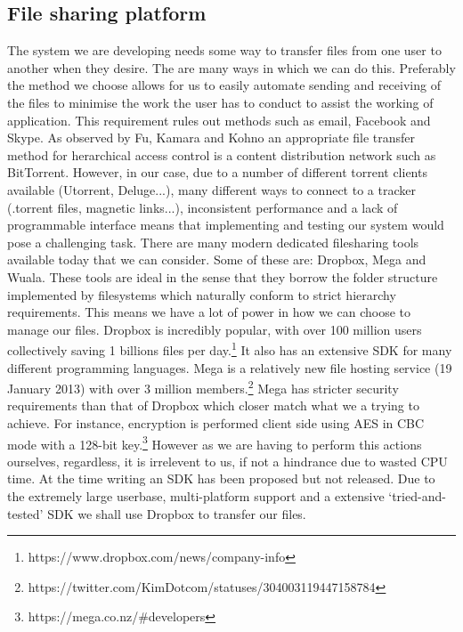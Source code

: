 \documentclass[12pt, titlepage]{article}
\begin{document}
\subsection{File sharing platform}
The system we are developing needs some way to transfer files from one user to another when they desire. The are many ways in which we can do this. Preferably the method we choose allows for us to easily automate sending and receiving of the files to minimise the work the user has to conduct to assist the working of application. This requirement rules out methods such as email, Facebook and Skype.
\newline \indent As observed by Fu, Kamara and Kohno an appropriate file transfer method for herarchical access control is a content distribution network such as BitTorrent.\cite{bittorrent} However, in our case, due to a number of different torrent clients available (Utorrent, Deluge...), many different ways to connect to a tracker (.torrent files, magnetic links...), inconsistent performance and a lack of programmable interface means that implementing and testing our system would pose a challenging task.
\newline \indent There are many modern dedicated filesharing tools available today that we can consider. Some of these are: Dropbox, Mega and Wuala. These tools are ideal in the sense that they borrow the folder structure implemented by filesystems which naturally conform to strict hierarchy requirements. This means we have a lot of power in how we can choose to manage our files. Dropbox is incredibly popular, with over 100 million users collectively saving 1 billions files per day.\footnote{https://www.dropbox.com/news/company-info} It also has an extensive SDK for many different programming languages. Mega is a relatively new file hosting service (19 January 2013) with over 3 million members.\footnote{https://twitter.com/KimDotcom/statuses/304003119447158784} Mega  has stricter security requirements than that of Dropbox which closer match what we a trying to achieve. For instance, encryption is performed client side using AES in CBC mode with a 128-bit key.\footnote{https://mega.co.nz/\#developers} However as we are having to perform this actions ourselves, regardless, it is irrelevent to us, if not a hindrance due to wasted CPU time. At the time writing an SDK has been proposed but not released.
\newline Due to the extremely large userbase, multi-platform support and a extensive `tried-and-tested' SDK we shall use Dropbox to transfer our files.
\end{document}
